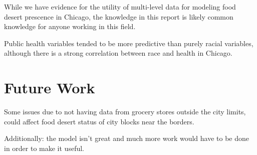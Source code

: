 \documentclass{report}
\begin{document}
While we have evidence for the utility of multi-level data for modeling food desert prescence in Chicago, the knowledge in this report is likely common knowledge for anyone working in this field.

Public health variables tended to be more predictive than purely racial variables, although there is a strong correlation between race and health in Chicago. 

\section*{Future Work}
Some issues due to not having data from grocery stores outside the city limits, could affect food desert status of city blocks near the borders. 

Additionally: the model isn't great and much more work would have to be done in order to make it useful. 
\end{document}
